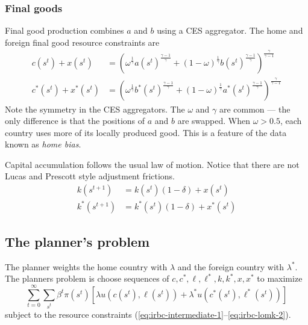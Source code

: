 \documentclass[11pt,pdftex,twoside,letterpaper]{exam}
\begin{document}
\subsubsection*{Final goods}
Final good production combines $a$ and $b$ using a CES aggregator. The home and foreign final good resource constraints are
\begin{align}\label{eq:irbc-final-rc}
  c(s^t)+x(s^t) &= \left(\omega^\frac{1}{\gamma}a(s^t)^\frac{\gamma-1}{\gamma}+ (1-\omega)^\frac{1}{\gamma}b(s^t)^\frac{\gamma-1}{\gamma}\right)^\frac{\gamma}{\gamma-1}\\
  c^*(s^t)+x^*(s^t) &= \left(\omega^\frac{1}{\gamma}b^*(s^t)^\frac{\gamma-1}{\gamma}+ (1-\omega)^\frac{1}{\gamma}a^*(s^t)^\frac{\gamma-1}{\gamma} \right)^\frac{\gamma}{\gamma-1}
\end{align}
Note the symmetry in the CES aggregators. The $\omega$ and $\gamma$ are common --- the only difference is that the positions of $a$ and $b$ are swapped. When $\omega>0.5$, each country uses more of its locally produced good. This is a feature of the data known as \textit{home bias}.

Capital accumulation follows the usual law of motion. Notice that there are not Lucas and Prescott style adjustment frictions.
\begin{align}
  k(s^{t+1}) &= k(s^t)\left(1-\delta\right)+x(s^t) \label{eq:irbc-lomk-1}\\
  k^*(s^{t+1}) &= k^*(s^t)\left(1-\delta\right)+x^*(s^t)\label{eq:irbc-lomk-2}
\end{align}

\subsection{The planner's problem}
The planner weights the home country with $\lambda$ and the foreign country with $\lambda^*$. The planners problem is choose sequences of $c,c^*,\ell, \ell^*, k, k^*, x, x^*$ to maximize
\begin{equation}\label{eq:irbc-planner-problem}
   \sum_{t=0}^\infty \sum_{s^t} \beta^t \pi(s^t)\left[\lambda u\left(c\left(s^t\right),\ell\left(s^t\right) \right) + \lambda^* u\left(c^*\left(s^t\right),\ell^*\left(s^t\right) \right) \right]
\end{equation}
subject to the resource constraints (\ref{eq:irbc-intermediate-1}--\ref{eq:irbc-lomk-2}).
\end{document}
